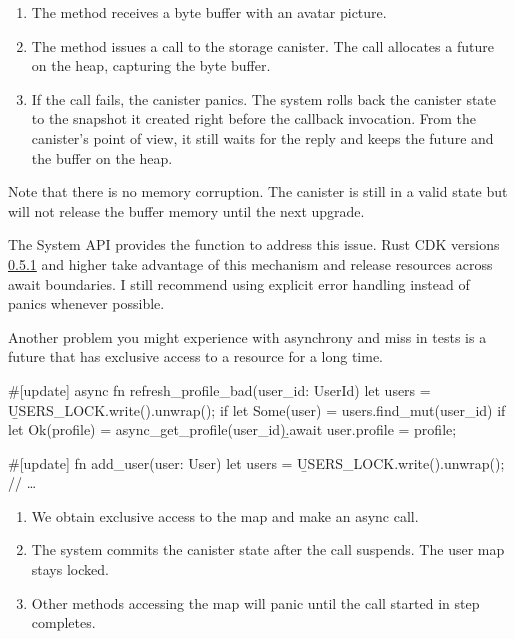 \documentclass{article}
\begin{document}
\begin{enumerate}
\item The method receives a byte buffer with an avatar picture.
\item
  The method issues a call to the storage canister.
  The call allocates a future on the heap, capturing the byte buffer.
\item
  If the call fails, the canister panics.
  The system rolls back the canister state to the snapshot it created right before the callback invocation.
  From the canister's point of view, it still waits for the reply and keeps the future and the buffer on the heap.
\end{enumerate}

Note that there is no memory corruption.
The canister is still in a valid state but will not release the buffer memory until the next upgrade.

The System API provides the \href{https://sdk.dfinity.org/docs/interface-spec/index.html}{} function to address this issue.
Rust CDK versions \href{https://github.com/dfinity/cdk-rs/blob/c7aaaddaaf5e39c90a51035f87be68a0215c8c10/src/ic-cdk/CHANGELOG.md#fixed-4}{0.5.1} and higher take advantage of this mechanism and release resources across await boundaries.
I still recommend using explicit error handling instead of panics whenever possible.

Another problem you might experience with asynchrony and miss in tests is a future that has exclusive access to a resource for a long time.


\begin{code}[bad]
#[update]
async fn refresh_profile_bad(user_id: UserId) {
   let users = \b{USERS_LOCK.write().unwrap()}; 
   if let Some(user) = users.find_mut(user_id) {
       if let Ok(profile) = async_get_profile(user_id)\b{.await} { 
           user.profile = profile;
       }
   }
}

#[update]
fn add_user(user: User) {
    let users = \b{USERS_LOCK.write().unwrap()}; 
    // \ldots
}
\end{code}

\begin{enumerate}
\item We obtain exclusive access to the  map and make an async call.
\item The system commits the canister state after the call suspends. The user map stays locked.
\item Other methods accessing the map will panic until the call started in step  completes.
\end{enumerate}
\end{document}

